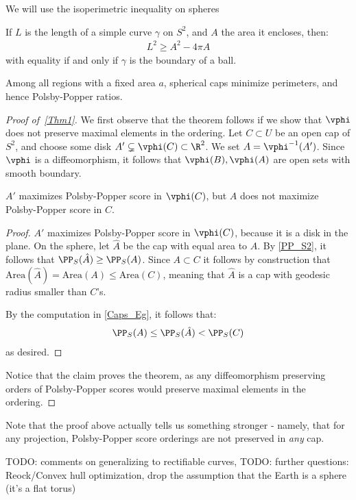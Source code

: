 We will use the isoperimetric inequality on spheres \cite{Rado} \cite{Oss}
\begin{Theorem}
  If $L$ is the length of a simple curve $\gamma$ on $S^2$, and 
  $A$ the area it encloses, then:
  \begin{align*}
    L^2\ge A^2-4\pi A
  \end{align*}
  with equality if and only if $\gamma$ is the boundary 
  of a ball.
\end{Theorem}
\begin{Corollary} \label{PP_S2}
  Among all regions with a fixed area $a$, spherical caps
  minimize perimeters, and hence Polsby-Popper ratios.
\end{Corollary}
\begin{proof}[Proof of~\ref{Thm1}]
  We first observe that the theorem 
  follows if we show that $\vphi$ 
  does not preserve maximal elements in the ordering.
  Let $C\subset U$ be an open cap of $S^2$, and 
  choose some disk $A'\subsetneq \vphi(C)\subset \R^2$. 
  We set $A = \vphi^{-1}(A')$. Since $\vphi$ is a 
  diffeomorphism, it follows that 
  $\vphi(B),\vphi(A)$ are open sets with smooth boundary.
  \begin{Claim}
    $A'$ maximizes Polsby-Popper score 
    in $\vphi(C)$, but $A$ does not maximize Polsby-Popper 
    score in $C$.
  \end{Claim}
  \begin{proof}
    $A'$ maximizes Polsby-Popper score in $\vphi(C)$, because 
    it is a disk in the plane. On the sphere, let 
    $\hat A$ be the cap with equal area to $A$. By 
    \cref{PP_S2}, it follows that 
    $\PP_S(\hat A)\ge \PP_S(A)$. Since $A\subset  C$ 
    it follows by construction that 
    $\mathrm{Area}(\hat A) = \mathrm{Area}(A) \le \mathrm{Area}(C)$, meaning 
    that $\hat A$ is a cap with geodesic radius 
    smaller than $C$'s.

    By the computation in \cref{Caps_Eg}, it follows
    that:
    \begin{align*}
      \PP_S(A)\le \PP_S(\hat A)< \PP_S(C)
    \end{align*}
    as desired.
  \end{proof}
  Notice that the claim proves the 
  theorem, as any diffeomorphism 
  preserving orders of Polsby-Popper scores would 
  preserve maximal elements in the  ordering.
\end{proof}


\begin{Remark}
  Note that the proof above actually tells us something 
  stronger - namely, that for any projection, Polsby-Popper score 
  orderings are not preserved in {\it any} cap.
\end{Remark}

TODO: comments on generalizing to rectifiable curves,
TODO: further questions: Reock/Convex hull
optimization, drop the assumption that the Earth is a 
sphere (it's a flat torus)
